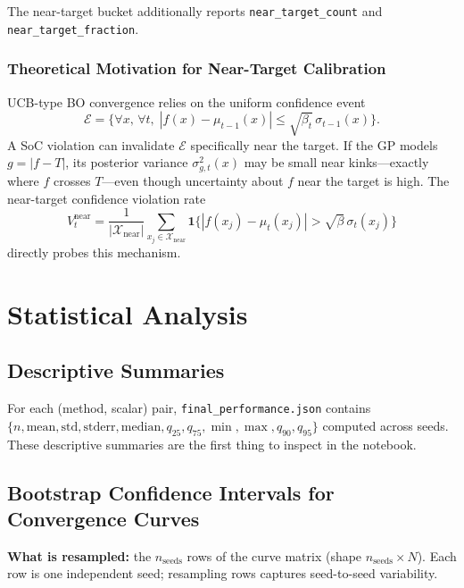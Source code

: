 \documentclass[11pt]{article}
\begin{document}
The near-target bucket additionally reports
\texttt{near\_target\_count} and \texttt{near\_target\_fraction}.
 
\subsubsection{Theoretical Motivation for Near-Target Calibration}
 
UCB-type BO convergence relies on the uniform confidence event
\[
  \mathcal{E}
  = \bigl\{
    \forall x,\,\forall t,\;
    |f(x) - \mu_{t-1}(x)| \le \sqrt{\beta_t}\,\sigma_{t-1}(x)
  \bigr\}.
\]
A SoC violation can invalidate $\mathcal{E}$ specifically near the target.
If the GP models $g = |f-T|$, its posterior variance $\sigma_{g,t}^2(x)$ may be
small near kinks---exactly where $f$ crosses $T$---even though uncertainty about
$f$ near the target is high.
The near-target confidence violation rate
\[
  V_t^{\mathrm{near}}
  = \frac{1}{|\mathcal{X}_{\mathrm{near}}|}
    \sum_{x_j \in \mathcal{X}_{\mathrm{near}}}
    \mathbf{1}\bigl\{|f(x_j) - \mu_t(x_j)| > \sqrt{\beta}\,\sigma_t(x_j)\bigr\}
\]
directly probes this mechanism.
 
\section{Statistical Analysis}
\label{sec:stats}
 
\subsection{Descriptive Summaries}
 
For each (method, scalar) pair, \texttt{final\_performance.json} contains
$\{n, \mathrm{mean}, \mathrm{std}, \mathrm{stderr}, \mathrm{median}, q_{25}, q_{75}, \min, \max, q_{90}, q_{95}\}$ computed across seeds. These descriptive summaries are the first thing to inspect in the notebook.
 
\subsection{Bootstrap Confidence Intervals for Convergence Curves}
\label{sec:bootstrap}
 
\textbf{What is resampled:} the $n_{\mathrm{seeds}}$ rows of the curve matrix
(shape $n_{\mathrm{seeds}} \times N$).
Each row is one independent seed; resampling rows captures seed-to-seed variability.
 
\end{document}
